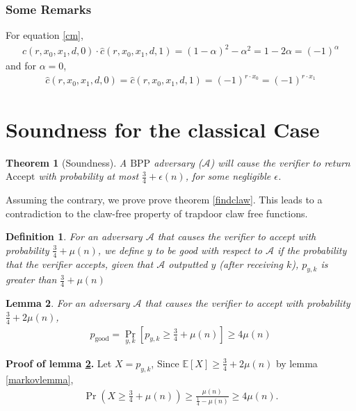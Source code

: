 \documentclass{article}
\newtheorem{definition}{Definition}
\newtheorem{thm}{Theorem}
\newtheorem{lem}[thm]{Lemma}
\begin{document}
\subsubsection{Some Remarks}
For equation \ref{cm}, \begin{align}\hat{c}(r,x_{0},x_{1},d,0)\cdot \hat{c}(r,x_{0},x_{1},d,1) = (1-\alpha)^{2} - \alpha^{2} = 1-2\alpha = (-1)^{\alpha}\end{align}  and for $\alpha=0$,
\begin{align}\hat{c}(r,x_{0},x_{1},d,0)=\hat{c}(r,x_{0},x_{1},d,1)=(-1)^{r\cdot x_{0}} = (-1)^{r\cdot x_{1}}\end{align} 

\section{Soundness for the classical Case}
\begin{thm}[Soundness]
A $\mathrm{BPP}$ adversary ($\mathcal{A}$) will cause the verifier to return $\mathrm{Accept}$ with probability at most $\frac{3}{4}+\epsilon(n)$, for some negligible $\epsilon$.
\end{thm} Assuming the contrary, we prove prove theorem \ref{findclaw}. This leads to a contradiction to the claw-free property of trapdoor claw free functions.

\begin{definition}
For an adversary $\mathcal{A}$ that causes the verifier to accept with probability $\frac{3}{4}+\mu(n)$, we define $y$ to be good with respect to $\mathcal{A}$ if the probability that the verifier accepts, given that $\mathcal{A}$ outputted $y$ (after receiving $k$), $p_{y,k}$ is greater than $\frac{3}{4}+\mu(n)$
\end{definition}
\begin{lem}
\label{goody}
For an adversary $\mathcal{A}$ that causes the verifier to accept with probability $\frac{3}{4}+2\mu(n)$, \begin{align}p_{\mathrm{good}}=\Pr_{y,k}[p_{y,k} \geq \frac{3}{4} + \mu(n)]\geq 4\mu(n)\end{align}
\end{lem} \textbf{Proof of lemma \ref{goody}.}
Let $X=p_{y,k}$, Since $\mathbb{E}[X]\geq\frac{3}{4}+2\mu(n)$ by lemma \ref{markovlemma}, \begin{align}
    \Pr\left(X\geq \frac{3}{4}+\mu(n)\right) \geq \frac{\mu(n)}{\frac{1}{4}-\mu(n)}\geq 4\mu(n).
\end{align}
\end{document}

